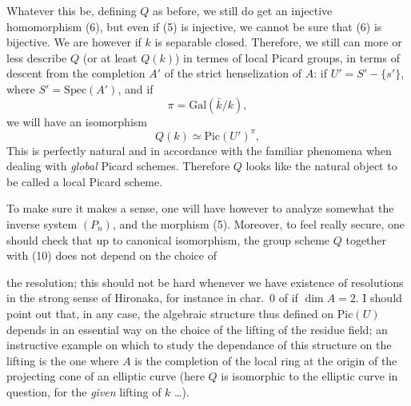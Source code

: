 \documentclass[11pt,a4paper]{article}
\begin{document}
Whatever this be, defining $Q$ as before, we still do get an injective
homomorphism (6), but even if (5) is injective, we cannot be sure that (6) is
bijective. We are however if $k$ is separable closed. Therefore, we still can
more or less describe $Q$ (or at least $Q(k)$) in termes of local Picard
groups, in terms of  descent from the completion $A'$ of the
strict henselization of $A$: if $U' = S' - \{s'\}$, where
$S' = \mathrm{Spec}(A')$, and if
\begin{equation*}
\tag{9} \pi = \mathrm{Gal}(\bar{k}/k) ,
\end{equation*}
we will have an isomorphism
\begin{equation*}
\tag{10} Q(k) \simeq \mathrm{Pic}(U')^{\pi} ,
\end{equation*}
This is perfectly natural and in accordance with the familiar phenomena when
dealing with \emph{global} Picard schemes. Therefore $Q$ looks like the natural
object to be called a local Picard scheme.

To make sure it makes a sense, one will have however to analyze somewhat the
inverse system $(P_n)$, and the morphism (5). Moreover, to feel really secure,
one should check that up to canonical isomorphism, the group scheme $Q$
together with (10) does not depend on the choice of

the resolution; this should not be hard whenever we have existence of
resolutions in the strong sense of Hironaka, for instance in char.~0 of if $\dim A = 2$. I
should point out that, in any case, the algebraic structure thus defined on
$\mathrm{Pic}(U)$ depends in an essential way on the choice of the lifting of
the residue field; an instructive example on which to study the dependance of
this structure on the lifting is the one where $A$ is the completion of the
local ring at the origin of the projecting cone of an elliptic curve (here $Q$
is isomorphic to the elliptic curve in question, for the \emph{given} lifting
of $k$ …).
\end{document}

